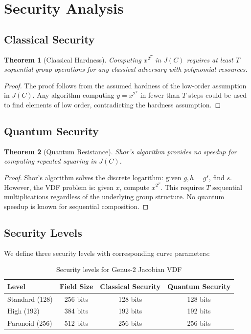 \documentclass[11pt,a4paper]{article}
\newtheorem{theorem}{Theorem}
\begin{document}
\section{Security Analysis}

\subsection{Classical Security}

\begin{theorem}[Classical Hardness]
Computing $x^{2^T}$ in $J(C)$ requires at least $T$ sequential group operations for any classical adversary with polynomial resources.
\end{theorem}

\begin{proof}
The proof follows from the assumed hardness of the low-order assumption in $J(C)$. Any algorithm computing $y = x^{2^T}$ in fewer than $T$ steps could be used to find elements of low order, contradicting the hardness assumption.
\end{proof}

\subsection{Quantum Security}

\begin{theorem}[Quantum Resistance]
Shor's algorithm provides no speedup for computing repeated squaring in $J(C)$.
\end{theorem}

\begin{proof}
Shor's algorithm solves the discrete logarithm: given $g, h = g^s$, find $s$. However, the VDF problem is: given $x$, compute $x^{2^T}$. This requires $T$ sequential multiplications regardless of the underlying group structure. No quantum speedup is known for sequential composition.
\end{proof}

\subsection{Security Levels}

We define three security levels with corresponding curve parameters:

\begin{table}[h]
\centering
\begin{tabular}{lccc}
\toprule
\textbf{Level} & \textbf{Field Size} & \textbf{Classical Security} & \textbf{Quantum Security} \\
\midrule
Standard (128) & 256 bits & 128 bits & 128 bits \\
High (192) & 384 bits & 192 bits & 192 bits \\
Paranoid (256) & 512 bits & 256 bits & 256 bits \\
\bottomrule
\end{tabular}
\caption{Security levels for Genus-2 Jacobian VDF}
\end{table}
\end{document}
